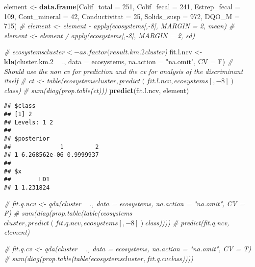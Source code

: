 \documentclass[]{article}
\newenvironment{Shaded}{\begin{snugshade}}{\end{snugshade}}
\newcommand{\KeywordTok}[1]{\textcolor[rgb]{0.13,0.29,0.53}{\textbf{#1}}}
\newcommand{\DataTypeTok}[1]{\textcolor[rgb]{0.13,0.29,0.53}{#1}}
\newcommand{\DecValTok}[1]{\textcolor[rgb]{0.00,0.00,0.81}{#1}}
\newcommand{\StringTok}[1]{\textcolor[rgb]{0.31,0.60,0.02}{#1}}
\newcommand{\CommentTok}[1]{\textcolor[rgb]{0.56,0.35,0.01}{\textit{#1}}}
\newcommand{\OperatorTok}[1]{\textcolor[rgb]{0.81,0.36,0.00}{\textbf{#1}}}
\newcommand{\NormalTok}[1]{#1}
\begin{document}
\begin{Shaded}
\begin{Highlighting}[]
\NormalTok{element <-}\StringTok{ }\KeywordTok{data.frame}\NormalTok{(}\DataTypeTok{Colif_total =} \DecValTok{251}\NormalTok{, }\DataTypeTok{Colif_fecal =} \DecValTok{241}\NormalTok{, }\DataTypeTok{Estrep_fecal =} \DecValTok{109}\NormalTok{, }\DataTypeTok{Cont_mineral =} \DecValTok{42}\NormalTok{, }\DataTypeTok{Conductivitat =} \DecValTok{25}\NormalTok{, }\DataTypeTok{Solids_susp =} \DecValTok{972}\NormalTok{, }\DataTypeTok{DQO_M =} \DecValTok{715}\NormalTok{)}
\CommentTok{# element <- element - apply(ecosystems[,-8], MARGIN = 2, mean)}
\CommentTok{# element <- element / apply(ecosystems[,-8], MARGIN = 2, sd)}

\CommentTok{# ecosystems$cluster <- as.factor(result.km.2$cluster)}
\NormalTok{fit.l.ncv <-}\StringTok{ }\KeywordTok{lda}\NormalTok{(cluster.km.}\DecValTok{2} \OperatorTok{~}\StringTok{ }\NormalTok{., }\DataTypeTok{data =}\NormalTok{ ecosystems, }\DataTypeTok{na.action =} \StringTok{"na.omit"}\NormalTok{, }\DataTypeTok{CV =}\NormalTok{ F) }\CommentTok{# Should use the non cv for prediction and the cv for analysis of the discriminant itself}
\CommentTok{# ct <- table(ecosystems$cluster, predict(fit.l.ncv,ecosystems[, -8])$class) }
\CommentTok{# sum(diag(prop.table(ct)))}
\KeywordTok{predict}\NormalTok{(fit.l.ncv, element)}
\end{Highlighting}
\end{Shaded}

\begin{verbatim}
## $class
## [1] 2
## Levels: 1 2
## 
## $posterior
##              1         2
## 1 6.268562e-06 0.9999937
## 
## $x
##        LD1
## 1 1.231824
\end{verbatim}

\begin{Shaded}
\begin{Highlighting}[]
\CommentTok{# fit.q.ncv <- qda(cluster ~ ., data = ecosystems, na.action = "na.omit", CV = F)}
\CommentTok{# sum(diag(prop.table(table(ecosystems$cluster, predict(fit.q.ncv, ecosystems[,-8])$class))))}
\CommentTok{# predict(fit.q.ncv, element)}

\CommentTok{# fit.q.cv <- qda(cluster ~ ., data = ecosystems, na.action = "na.omit", CV = T)}
\CommentTok{# sum(diag(prop.table(table(ecosystems$cluster, fit.q.cv$class))))}
\end{Highlighting}
\end{Shaded}
\end{document}
